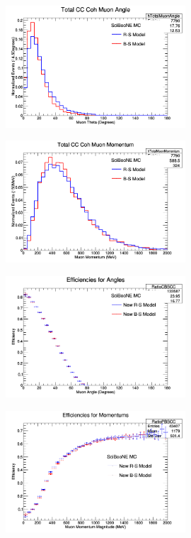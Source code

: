 \documentclass[11pt]{article}
\begin{document}
\begin{figure}[H]
\centering
\includegraphics[width=0.6\textwidth]{ANMCombinedPlotsImages/13-ANMCombinedPlots.png}
\caption{}
\end{figure}

\begin{figure}[H]
\centering
\includegraphics[width=0.6\textwidth]{ANMCombinedPlotsImages/14-ANMCombinedPlots.png}
\caption{}
\end{figure}

\begin{figure}[H]
\centering
\includegraphics[width=0.6\textwidth]{ANMCombinedPlotsImages/15-ANMCombinedPlots.png}
\caption{}
\end{figure}

\begin{figure}[H]
\centering
\includegraphics[width=0.6\textwidth]{ANMCombinedPlotsImages/16-ANMCombinedPlots.png}
\caption{}
\end{figure}
\end{document}
